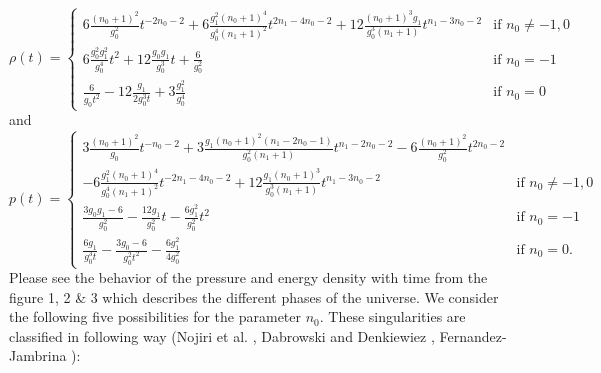 \documentclass[11pt]{article}
\theoremstyle{theorem}
\theoremstyle{defi}
\begin{document}
\begin{equation}
\label{eqn27}
\rho(t)=\begin{cases}6\frac{(n_0+1)^2}{g_0^2}t^{-2n_0-2}+6\frac{g_1^2(n_0+1)^4}{g_0^4(n_1+1)^2}t^{2n_1-4n_0-2}
+12\frac{(n_0+1)^3g_1}{g_0^3(n_1+1)}t^{n_1-3n_0-2} & \mbox{if  } n_0\neq -1, 0\\
6\frac{g_0^2g_1^2}{g_0^4}t^2+12\frac{g_0g_1}{g_0^3}t+\frac{6}{g_0^2} & \mbox{if  } n_0=-1\\
\frac{6}{g_0t^2}-12\frac{g_1}{2g_0^3t}+3\frac{g_1^2}{g_0^4} & \mbox{if  } n_0=0
\end{cases}
\end{equation}
and
\begin{equation}
\label{eqn28}
p(t)=\begin{cases}
3\frac{(n_0+1)^2}{g_0}t^{-n_0-2}+3\frac{g_1(n_0+1)^2(n_1-2n_0-1)}{g_0^2(n_1+1)}t^{n_1-2n_0-2}
-6\frac{(n_0+1)^2}{g_0^2}t^{2n_0-2} &  \\
-6\frac{g_1^2(n_0+1)^4}{g_0^4(n_1+1)^2}t^{-2n_1-4n_0-2}
+12\frac{g_1(n_0+1)^3}{g_0^3(n_1+1)}t^{n_1-3n_0-2} & \mbox{if  } n_0\neq -1, 0\\
\frac{3g_0g_1-6}{g_0^2}-\frac{12g_1}{g_0^2}t-\frac{6g_1^2}{g_0^2}t^2 & \mbox{if  } n_0=-1\\
\frac{6g_1}{g_0^3t}-\frac{3g_0-6}{g_0^2t^2}-\frac{6g_1^2}{4g_0^2} & \mbox{if  } n_0=0.
\end{cases}
\end{equation}
Please see the behavior of the pressure and energy density with time from the figure 1, 2 \& 3 which describes the different phases of the universe. We consider the following five possibilities for the parameter $n_0$. These singularities are classified in following way (Nojiri et al. \cite{22}, Dabrowski and Denkiewiez \cite{33}, Fernandez-Jambrina \cite{34}):
\end{document}
